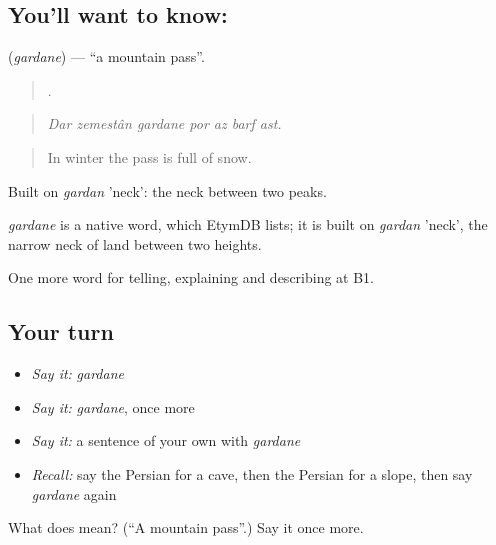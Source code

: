 \subsection*{You'll want to know: }
\textbf{} (\emph{gardane}) — \textquotedblleft{}a mountain pass\textquotedblright{}.

\begin{quote}
      .
\end{quote}

\begin{quote}
\emph{Dar zemestân gardane por az barf ast.}
\end{quote}

\begin{quote}
In winter the pass is full of snow.
\end{quote}

Built on \emph{gardan} 'neck': the neck between two peaks.

\begin{cousinweb}
\emph{gardane} is a native word, which EtymDB lists; it is built on \emph{gardan} 'neck', the narrow neck of land between two heights.
\end{cousinweb}

\begin{grammarlens}[title={What you've built}]
One more word for telling, explaining and describing at B1.
\end{grammarlens}

\subsection*{Your turn}
\begin{itemize}
\raggedright
  \item \emph{Say it:} \emph{gardane}
  \item \emph{Say it:} \emph{gardane}, once more
  \item \emph{Say it:} a sentence of your own with \emph{gardane}
  \item \emph{Recall:} say the Persian for a cave, then the Persian for a slope, then say \emph{gardane} again
\end{itemize}

\begin{tcolorbox}[breakable,colback=teal!4,colframe=teal!35!black,title={Before you move on}]
What does  mean? (\textquotedblleft{}A mountain pass\textquotedblright{}.) Say it once more.
\end{tcolorbox}
